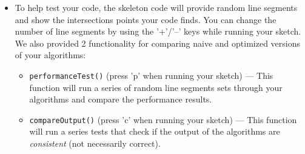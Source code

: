 \documentclass[a4paper,12pt]{article}
\begin{document}
\begin{itemize}
\begin{itemize}
\end{itemize}

\item To help test your code, the skeleton code will provide random line segments and show the intersections points your code finds. You can change the number of line segments by using the '+'/'--' keys while running your sketch. We also provided 2 functionality for comparing naive and optimized versions of your algorithms:


\begin{itemize}

   \item \texttt{performanceTest()} (press 'p' when running your sketch) --- This function will run a series of random line segments sets through your algorithms and compare the performance results.

   \item \texttt{compareOutput()} (press 'c' when running your sketch) --- This function will run a series tests that check if the output of the algorithms are \textit{consistent} (not necessarily correct).

   
\end{itemize}
\end{itemize}
\end{document}
